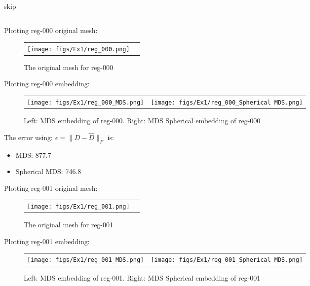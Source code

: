 \subsection{}
skip

\clearpage
\subsection{}
Plotting reg-000 original mesh:
\begin{figure*}[h!]
\centering
\begin{tabular}{cc}
    \texttt{[image: figs/Ex1/reg\_000.png]}
\end{tabular}
\caption{\small The original mesh for reg-000}
\end{figure*}

Plotting reg-000 embedding:
\begin{figure*}[h]
\centering
\begin{tabular}{cc}
    \texttt{[image: figs/Ex1/reg\_000\_MDS.png]} &
    \texttt{[image: figs/Ex1/reg\_000\_Spherical MDS.png]}
\end{tabular}
\caption{\small Left: MDS embedding of reg-000. Right: MDS Spherical embedding of reg-000}
\end{figure*}

The error using: \(\epsilon=\|D-\hat{D}\|_F\) is:
\begin{itemize}
\item MDS: 877.7
\item Spherical MDS: 746.8
\end{itemize}

\clearpage
Plotting reg-001 original mesh:
\begin{figure*}[h]
\centering
\begin{tabular}{cc}
    \texttt{[image: figs/Ex1/reg\_001.png]}
\end{tabular}
\caption{\small The original mesh for reg-001}
\end{figure*}

Plotting reg-001 embedding:
\begin{figure*}[h]
\centering
\begin{tabular}{cc}
    \texttt{[image: figs/Ex1/reg\_001\_MDS.png]} &
    \texttt{[image: figs/Ex1/reg\_001\_Spherical MDS.png]}
\end{tabular}
\caption{\small Left: MDS embedding of reg-001. Right: MDS Spherical embedding of reg-001}
\end{figure*}

